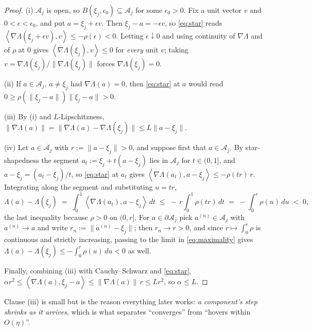\documentclass[11pt]{article}
\theoremstyle{definition}
\newcommand{\cA}{\mathcal{A}}
\newcommand{\ip}[2]{\left\langle #1, #2 \right\rangle}
\begin{document}
\begin{proof}
(i) $\cA_j$ is open, so $B(\xi_j,\epsilon_0) \subseteq \cA_j$ for some
$\epsilon_0 > 0$. Fix a unit vector $v$ and $0 < \epsilon < \epsilon_0$, and put
$a = \xi_j + \epsilon v$. Then $\xi_j - a = -\epsilon v$, so \eqref{eq:star} reads
$\ip{\nabla\Lambda(\xi_j + \epsilon v)}{v} \le -\rho(\epsilon) < 0$. Letting
$\epsilon \downarrow 0$ and using continuity of $\nabla\Lambda$ and of $\rho$ at
$0$ gives $\ip{\nabla\Lambda(\xi_j)}{v} \le 0$ for \emph{every} unit $v$; taking
$v = \nabla\Lambda(\xi_j)/\|\nabla\Lambda(\xi_j)\|$ forces
$\nabla\Lambda(\xi_j) = 0$.

(ii) If $a \in \cA_j$, $a \ne \xi_j$ had $\nabla\Lambda(a) = 0$, then
\eqref{eq:star} at $a$ would read
$0 \ge \rho(\|\xi_j - a\|)\|\xi_j - a\| > 0$.

(iii) By (i) and $L$-Lipschitzness,
$\|\nabla\Lambda(a)\| = \|\nabla\Lambda(a) - \nabla\Lambda(\xi_j)\|
\le L\|a - \xi_j\|$.

(iv) Let $a \in \overline{\cA_j}$ with $r := \|a - \xi_j\| > 0$, and suppose first
that $a \in \cA_j$. By star-shapedness the segment $a_t := \xi_j + t(a - \xi_j)$
lies in $\cA_j$ for $t \in (0,1]$, and $a - \xi_j = (a_t - \xi_j)/t$, so
\eqref{eq:star} at $a_t$ gives
$\ip{\nabla\Lambda(a_t)}{a - \xi_j} \le -\rho(tr)\,r$. Integrating along the
segment and substituting $u = tr$,
\begin{equation}\label{eq:maximality}
  \Lambda(a) - \Lambda(\xi_j)
  \;=\; \int_0^1 \ip{\nabla\Lambda(a_t)}{a - \xi_j}\,dt
  \;\le\; -\,r\int_0^1 \rho(tr)\,dt
  \;=\; -\int_0^{r}\rho(u)\,du \;<\; 0 ,
\end{equation}
the last inequality because $\rho > 0$ on $(0,r]$. For $a \in \partial\cA_j$ pick
$a^{(n)} \in \cA_j$ with $a^{(n)} \to a$ and write $r_n := \|a^{(n)} - \xi_j\|$;
then $r_n \to r > 0$, and since $r \mapsto \int_0^r \rho$ is continuous and
strictly increasing, passing to the limit in \eqref{eq:maximality} gives
$\Lambda(a) - \Lambda(\xi_j) \le -\int_0^{r}\rho(u)\,du < 0$ as well.

Finally, combining (iii) with Cauchy--Schwarz and \eqref{eq:star},
$\alpha r^2 \le \ip{\nabla\Lambda(a)}{\xi_j - a} \le \|\nabla\Lambda(a)\|\,r
\le L r^2$, so $\alpha \le L$.
\end{proof}

Clause (iii) is small but is the reason everything later works: \emph{a
component's step shrinks as it arrives}, which is what separates ``converges''
from ``hovers within $O(\eta)$''.
\end{document}
